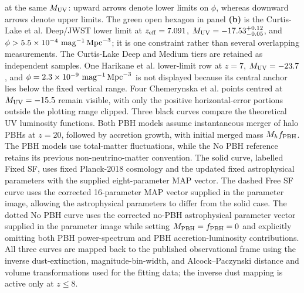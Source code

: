 {at the same $M_{\rm UV}$: upward arrows denote lower limits on $\phi$,
whereas downward arrows denote upper limits.
The green open hexagon in panel \textbf{(b)} is the Curtis-Lake et al.
Deep/JWST lower limit at $z_{\rm eff}=7.091$,
$M_{\rm UV}=-17.53^{+0.12}_{-0.05}$, and
$\phi>5.5\times10^{-4}\ {\rm mag}^{-1}\,{\rm Mpc}^{-3}$; it is one
constraint rather than several overlapping measurements.
The Curtis-Lake Deep and Medium tiers are retained as independent
samples. One Harikane et al. lower-limit row at $z=7$,
$M_{\rm UV}=-23.7$, and $\phi=2.3\times10^{-9}\
{\rm mag}^{-1}\,{\rm Mpc}^{-3}$ is not displayed because its central
anchor lies below the fixed vertical range. Four Chemerynska et al.
points centred at $M_{\rm UV}=-15.5$ remain visible, with only the
positive horizontal-error portions outside the plotting range
clipped. Three black curves compare the theoretical UV luminosity functions. Both PBH models assume instantaneous merger of halo PBHs at $z=20$, followed by accretion growth, with initial merged mass $M_h f_{\rm PBH}$. The PBH models use total-matter fluctuations, while the No PBH reference retains its previous non-neutrino-matter convention. The solid curve, labelled Fixed SF, uses fixed Planck-2018 cosmology and the updated fixed astrophysical parameters with the supplied eight-parameter MAP vector. The dashed Free SF curve uses the corrected 16-parameter MAP vector supplied in the parameter image, allowing the astrophysical parameters to differ from the solid case. The dotted No PBH curve uses the corrected no-PBH astrophysical parameter vector supplied in the parameter image while setting $M_{\rm PBH}=f_{\rm PBH}=0$ and explicitly omitting both PBH power-spectrum and PBH accretion-luminosity contributions. All three curves are mapped back to the published observational frame using the inverse dust-extinction, magnitude-bin-width, and Alcock--Paczynski distance and volume transformations used for the fitting data; the inverse dust mapping is active only at $z\leq8$.}

